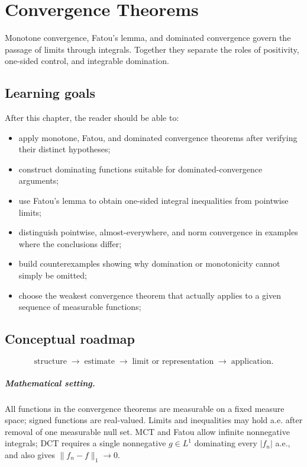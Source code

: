 \chapter{Convergence Theorems}
\label{ch:iii04}

Monotone convergence, Fatou's lemma, and dominated convergence govern the passage of limits through integrals. Together they separate the roles of positivity, one-sided control, and integrable domination.

\section*{Learning goals}
After this chapter, the reader should be able to:
\begin{itemize}
\item apply monotone, Fatou, and dominated convergence theorems after verifying their distinct hypotheses;
\item construct dominating functions suitable for dominated-convergence arguments;
\item use Fatou's lemma to obtain one-sided integral inequalities from pointwise limits;
\item distinguish pointwise, almost-everywhere, and norm convergence in examples where the conclusions differ;
\item build counterexamples showing why domination or monotonicity cannot simply be omitted;
\item choose the weakest convergence theorem that actually applies to a given sequence of measurable functions;
\end{itemize}
\section*{Conceptual roadmap}
\[
\boxed{\text{structure}\;\longrightarrow\;\text{estimate}\;\longrightarrow\;\text{limit or representation}\;\longrightarrow\;\text{application}.}
\]

\paragraph{Mathematical setting.}
All functions in the convergence theorems are measurable on a fixed measure space; signed functions are real-valued. Limits and inequalities may hold a.e. after removal of one measurable null set. MCT and Fatou allow infinite nonnegative integrals; DCT requires a single nonnegative $g\in L^1$ dominating every $|f_n|$ a.e., and also gives $\|f_n-f\|_1\to0$.

